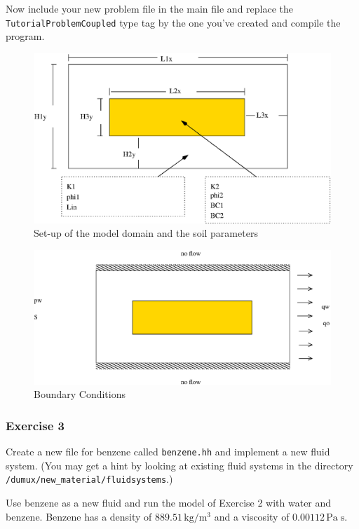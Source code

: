 Now include your new problem file in the main file and replace the
\texttt{TutorialProblemCoupled} type tag by the one you've created and
compile the program.


\begin{figure}[h]
\centering
\includegraphics[width=0.8\linewidth,keepaspectratio]{EPS/Ex2_Domain.eps}
\caption{Set-up of the model domain and the soil parameters}\label{tutorial-coupled:ex2_Domain}
\end{figure}

\begin{figure}[h]
\centering
\includegraphics[width=0.8\linewidth,keepaspectratio]{EPS/Ex2_Boundary.eps}
\caption{Boundary Conditions}\label{tutorial-coupled:ex2_BC}
\end{figure}

\subsubsection{Exercise 3}

Create a new file for benzene called \texttt{benzene.hh} and implement
a new fluid system. (You may get a hint by looking at existing fluid 
systems in the directory \verb+/dumux/new_material/fluidsystems+.)

Use benzene as a new fluid and run the model of Exercise 2 with water
and benzene. Benzene has a density of $889.51 \, \text{kg} / \text{m}^3$
and a viscosity of $0.00112 \, \text{Pa} \; \text{s}$. 

